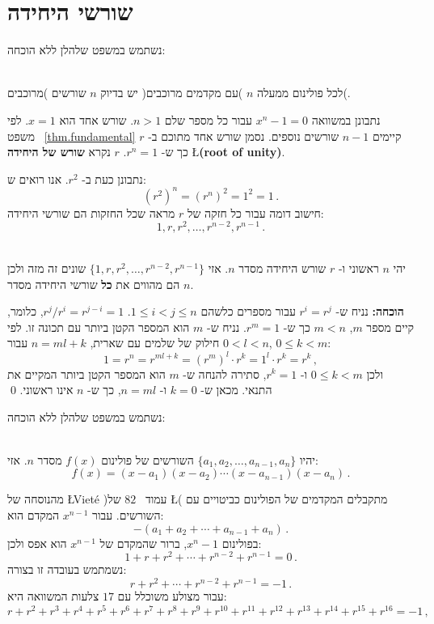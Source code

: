 

\section{שורשי היחידה}\label{s.roots}

נשתמש במשפט שלהלן ללא הוכחה:
\begin{theorem}\label{thm.fundamental}\mbox{}\\
לכל פולינום ממעלה 
$n$
)עם מקדמים מרוכבים(
יש בדיוק
$n$
שורשים
)מרוכבים(.
\end{theorem}
נתבונן במשוואה
$x^{n}-1=0$
עבור כל מספר שלם
$n>	 1$.
שורש אחד הוא
$x=1$.
לפי משפט~%
\ref{thm.fundamental}
קיימים
$n-1$
שורשים נוספים. נסמן שורש אחד מתוכם ב-%
$r$
כך ש-%
$r^{n}=1$.
$r$
נקרא
\textbf{שורש של היחידה}
\L{\textbf{(root of unity)}}.


נתבונן כעת ב-%
$r^2$.
אנו רואים ש:
\[
(r^2)^n=(r^{n})^2=1^2=1\,.
\]
חישוב דומה עבור כל חזקה של
$r$
מראה שכל החזקות הם שורשי היחידה:
\[
1, r, r^2, \ldots, r^{n-2}, r^{n-1}\,.
\]



\begin{theorem}\label{thm.roots-of-unity}\mbox{}\\
יהי
$n$
ראשוני ו-%
$r$
שורש היחידה מסדר 
$n$.
אזי
$\{1,r,r^2,\ldots,r^{n-2},r^{n-1}\}$
שונים זה מזה ולכן הם מהווים את 
\textbf{כל}
שורשי היחידה מסדר
$n$.
\end{theorem}
\textbf{הוכחה:}
נניח ש-%
$r^i=r^j$
עבור מספרים כלשהם
$1\leq i<j\leq n$.
$r^j/r^i=r^{j-i}=1$,
כלומר, קיים מספר
$m$,
$m<n$
כך ש-%
$r^m=1$.
נניח ש-%
$m$
הוא המספר הקטן ביותר עם תכונה זו. 
לפי חילוק של שלמים עם שארית,
$n=ml+k$
עבור
$0<l<n$,
$0\leq k<m$:
\[
1=r^n=r^{ml+k}=(r^m)^l\cdot r^k=1^l\cdot r^k=r^k\,,
\]
ולכן 
$0\leq k<m$ 
ו-%
$r^k=1$,
סתירה להנחה ש-%
$m$
הוא המספר הקטן ביותר המקיים את התנאי. מכאן ש-%
$k=0$
ו-%
$n=ml$,
כך ש-%
$n$
אינו ראשוני.
\qed

נשתמש במשפט שלהלן ללא הוכחה:
\begin{theorem}\mbox{}\\
יהיו
$\{a_1,a_2,\ldots,a_{n-1},a_n\}$
השורשים של פולינום
$f(x)$
מסדר
$n$.
אזי:
\[
f(x) =(x-a_1) (x-a_2)\cdots (x-a_{n-1})(x-a_n)\,.
\]
\end{theorem}



מהנוסחה של
\L{Viet\'{e}}
)עמוד~%
$82$ 
של
\L{\cite{jorg}}(
מתקבלים המקדמים של הפולינום כביטויים עם השורשים. עבור
$x^{n-1}$
המקדם הוא:
\[
-(a_1+a_2+\cdots+a_{n-1}+a_n)\,.
\]
בפולינום
$x^n-1$,
ברור שהמקדם של 
$x^{n-1}$
הוא אפס ולכן:
\[
1+r+r^2+\cdots + r^{n-2}+r^{n-1}=0\,.
\]
נשמתמש בעובדה זו בצורה:
\[
r+r^2+\cdots + r^{n-2}+r^{n-1}=-1\,.
\]
עבור מצולע משוכלל עם 
$17$
צלעות המשוואה היא:
\[
r+r^2+r^3+r^4+r^5+r^6+r^7+r^8+r^9+r^{10}+r^{11}+r^{12}+r^{13}+r^{14} + r^{15}+r^{16}=-1\,,
\]

